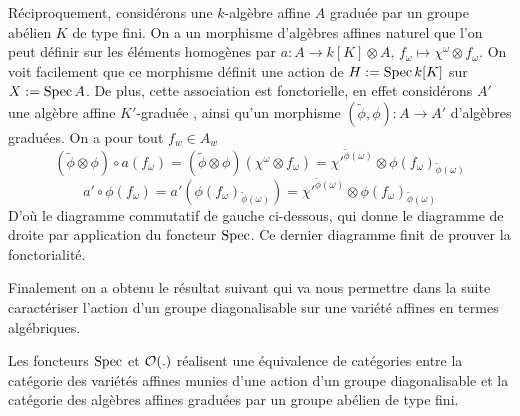 Réciproquement, considérons une $k$-algèbre affine $A$ graduée par un groupe abélien $K$ de type fini. On a un morphisme d'algèbres affines naturel que l'on peut définir sur les éléments homogènes par $a:A\rightarrow k[K]\otimes A,\, f_{\omega}\mapsto \chi^{\omega}\otimes f_{\omega}$. On voit facilement que ce morphisme définit une action de $H:=\operatorname{Spec} k[K]$ sur $X:=\operatorname{Spec} A$. De plus, cette association est fonctorielle, en effet considérons $A'$ une algèbre affine $K'$-graduée , ainsi qu'un morphisme $(\widetilde{\phi},\phi):A\rightarrow A'$ d'algèbres graduées. On a pour tout $f_w\in A_w$
$$(\widetilde{\phi}\otimes \phi)\circ a(f_\omega)=(\widetilde{\phi}\otimes \phi)(\chi^{\omega}\otimes f_\omega) = \chi'^{\widetilde{\phi}(\omega)}\otimes \phi(f_\omega)_{\widetilde{\phi}(\omega)}$$ 
$$a'\circ \phi(f_\omega)=a'(\phi(f_\omega)_{\widetilde{\phi}(\omega)})=\chi'^{\widetilde{\phi}(\omega)}\otimes \phi(f_\omega)_{\widetilde{\phi}(\omega)}$$
D'où le diagramme commutatif de gauche ci-dessous, qui donne le diagramme de droite par application du foncteur $\operatorname{Spec}$. Ce dernier diagramme finit de prouver la fonctorialité.
\begin{multicols}{2}
	\begin{center}
	\end{center}

	\columnbreak
	\begin{center}
	\end{center}
\end{multicols}

Finalement on a obtenu le résultat suivant qui va nous permettre dans la suite caractériser l'action d'un groupe diagonalisable sur une variété affines en termes algébriques.

\begin{prop}
Les foncteurs $\operatorname{Spec}$ et $\mathcal{O}(.)$ réalisent une équivalence de catégories entre la catégorie des variétés affines munies d'une action d'un groupe diagonalisable et la catégorie des algèbres affines graduées par un groupe abélien de type fini. 
\end{prop}

